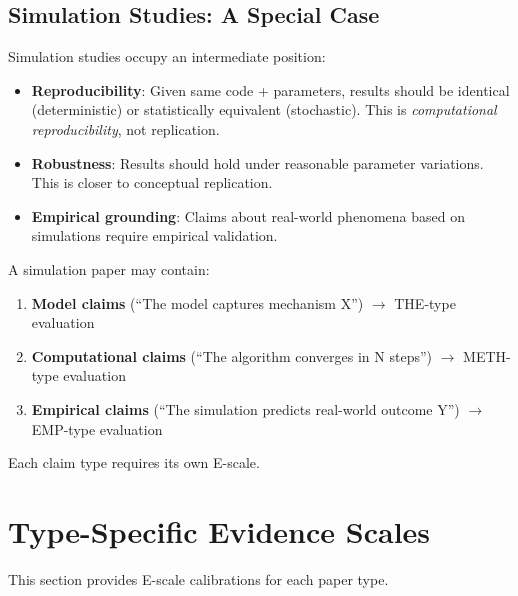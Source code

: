 \documentclass[11pt,a4paper]{article}
\begin{document}
\subsection{Simulation Studies: A Special Case}

Simulation studies occupy an intermediate position:

\begin{itemize}
    \item \textbf{Reproducibility}: Given same code + parameters, results should be identical (deterministic) or statistically equivalent (stochastic). This is \textit{computational reproducibility}, not replication.

    \item \textbf{Robustness}: Results should hold under reasonable parameter variations. This is closer to conceptual replication.

    \item \textbf{Empirical grounding}: Claims about real-world phenomena based on simulations require empirical validation.
\end{itemize}

\begin{warningbox}[title={Simulation Claims Require Careful Classification}]
A simulation paper may contain:
\begin{enumerate}
    \item \textbf{Model claims} (``The model captures mechanism X'') $\rightarrow$ THE-type evaluation
    \item \textbf{Computational claims} (``The algorithm converges in N steps'') $\rightarrow$ METH-type evaluation
    \item \textbf{Empirical claims} (``The simulation predicts real-world outcome Y'') $\rightarrow$ EMP-type evaluation
\end{enumerate}
Each claim type requires its own E-scale.
\end{warningbox}


\section{Type-Specific Evidence Scales}
\label{sec:evidence-scales}

This section provides E-scale calibrations for each paper type.
\end{document}
